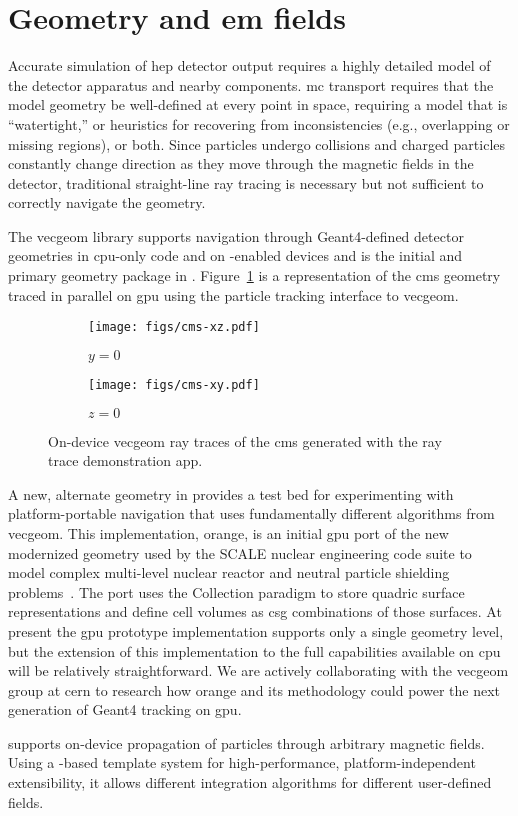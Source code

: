 \section{Geometry and \ac{em} fields}

Accurate simulation of \ac{hep} detector output requires a highly detailed model
of the detector apparatus and nearby components. \ac{mc} transport requires that
the model geometry be well-defined at every point in space, requiring a model
that is ``watertight,'' or heuristics for recovering from inconsistencies (e.g.,
overlapping or missing regions), or both. Since particles undergo collisions and
charged particles constantly change direction as they move through the magnetic
fields in the detector, traditional straight-line ray tracing is necessary but
not sufficient to correctly navigate the geometry.

The \acs{vecgeom} library supports navigation through Geant4-defined detector
geometries in \ac{cpu}-only code and on \cuda-enabled devices
\cite{apostolakis_towards_2015} and is the initial and primary geometry package
in \celeritas. Figure~\ref{fig:vecgeom-cms} is a representation of the \ac{cms}
geometry traced in parallel on \ac{gpu} using the \celeritas particle tracking
interface to \acs{vecgeom}.
\begin{figure}
  \centering%
  \begin{subfigure}{3in}%
    \centering%
    \texttt{[image: figs/cms-xz.pdf]}%
    \caption{$y=0$}%
  \end{subfigure}%
  \begin{subfigure}{3in}%
    \centering%
    \texttt{[image: figs/cms-xy.pdf]}%
    \caption{$z=0$}%
  \end{subfigure}
  \caption{On-device \acs{vecgeom} ray traces of the \acs{cms} generated with
the \celeritas ray trace demonstration app.}
\label{fig:vecgeom-cms}
\end{figure}

A new, alternate geometry in \celeritas provides a test bed for experimenting
with platform-portable navigation that uses fundamentally different algorithms
from \acs{vecgeom}. This implementation, \ac{orange}, is an initial \ac{gpu}
port of the new modernized geometry used by the SCALE nuclear engineering code
suite to model complex multi-level nuclear reactor and neutral particle
shielding problems~\cite{scale}. The \celeritas port uses the Collection paradigm
%
%
to store quadric surface representations and
define cell volumes as \ac{csg} combinations of those surfaces. At present the
\ac{gpu} prototype implementation supports only a single geometry level, but the
extension of this implementation to the full capabilities available on \ac{cpu}
will be relatively straightforward. We are actively collaborating with the
\acs{vecgeom} group at \acs{cern} to research how \ac{orange} and its
methodology could power the next generation of Geant4 tracking on \ac{gpu}.

\celeritas supports on-device propagation of particles through arbitrary
magnetic fields. Using a \Cpp-based template system for high-performance,
platform-independent extensibility, it allows different integration algorithms
for different user-defined fields.

